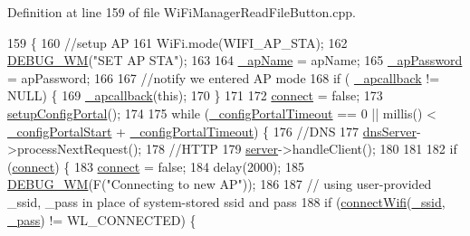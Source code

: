 Definition at line 159 of file Wi\+Fi\+Manager\+Read\+File\+Button.\+cpp.


\begin{DoxyCode}
159                                                                                   \{
160   \textcolor{comment}{//setup AP}
161   WiFi.mode(WIFI\_AP\_STA);
162   \hyperlink{class_wi_fi_manager_ae5f595c670ccbcf9a191baf50f5c7c26}{DEBUG\_WM}(\textcolor{stringliteral}{"SET AP STA"});
163 
164   \hyperlink{class_wi_fi_manager_a2c27e2f375122254cde4b2fd9ed1e117}{\_apName} = apName;
165   \hyperlink{class_wi_fi_manager_a63fb98629ab722ec513c14c73f352c12}{\_apPassword} = apPassword;
166 
167   \textcolor{comment}{//notify we entered AP mode}
168   \textcolor{keywordflow}{if} ( \hyperlink{class_wi_fi_manager_ad166247d94aef10a3a8aa34da1351b27}{\_apcallback} != NULL) \{
169     \hyperlink{class_wi_fi_manager_ad166247d94aef10a3a8aa34da1351b27}{\_apcallback}(\textcolor{keyword}{this});
170   \}
171 
172   \hyperlink{class_wi_fi_manager_a7be7e74e93283eea089af659184dd906}{connect} = \textcolor{keyword}{false};
173   \hyperlink{class_wi_fi_manager_a1743325d0dd86d011df96b22d2a0ddd6}{setupConfigPortal}();
174 
175   \textcolor{keywordflow}{while} (\hyperlink{class_wi_fi_manager_ae6c969ba67e0a029dcde1c3511ca79b7}{\_configPortalTimeout} == 0 || millis() < 
      \hyperlink{class_wi_fi_manager_a64bd63776978c1f61ed9e84926cf4a51}{\_configPortalStart} + \hyperlink{class_wi_fi_manager_ae6c969ba67e0a029dcde1c3511ca79b7}{\_configPortalTimeout}) \{
176     \textcolor{comment}{//DNS}
177     \hyperlink{class_wi_fi_manager_af44ccd00daee619a7bcc89000fa063ca}{dnsServer}->processNextRequest();
178     \textcolor{comment}{//HTTP}
179     \hyperlink{class_wi_fi_manager_a509523a01c0395cf0dc235b074f2a5ea}{server}->handleClient();
180 
181 
182     \textcolor{keywordflow}{if} (\hyperlink{class_wi_fi_manager_a7be7e74e93283eea089af659184dd906}{connect}) \{
183       \hyperlink{class_wi_fi_manager_a7be7e74e93283eea089af659184dd906}{connect} = \textcolor{keyword}{false};
184       delay(2000);
185       \hyperlink{class_wi_fi_manager_ae5f595c670ccbcf9a191baf50f5c7c26}{DEBUG\_WM}(F(\textcolor{stringliteral}{"Connecting to new AP"}));
186 
187       \textcolor{comment}{// using user-provided  \_ssid, \_pass in place of system-stored ssid and pass}
188       \textcolor{keywordflow}{if} (\hyperlink{class_wi_fi_manager_ae0ae27b5543b47585728c084c3bbdca7}{connectWifi}(\hyperlink{class_wi_fi_manager_a43fdc9234ac52d98aeea31148f96526d}{\_ssid}, \hyperlink{class_wi_fi_manager_a7486c2c0b67884ea872a4fe56d3450b2}{\_pass}) != WL\_CONNECTED) \{

\end{DoxyCode}
